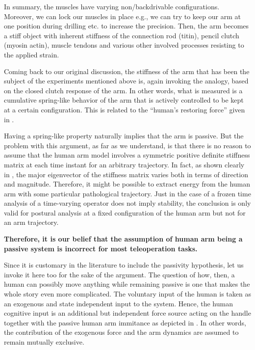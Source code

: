 In summary, the muscles have varying non/backdrivable configurations. Moreover, we can lock our muscles in place
e.g., we can try to keep our arm at one position during drilling etc. to increase the precision. Then, the arm becomes
a stiff object with inherent stiffness of the connection rod (titin), pencil clutch (myosin actin), muscle tendons and
 various other involved processes resisting to the applied strain. 

Coming back to our original discussion, the stiffness of the arm that has been the subject of the experiments mentioned 
above is, again invoking the analogy, based on the closed clutch response of the arm. In other words, what is measured 
is a cumulative spring-like behavior of the arm that is actively controlled to be kept at a certain configuration. This 
is related to the \enquote{human's restoring force} given in . 

Having a spring-like property naturally implies that the arm is passive. But the problem with this argument, as far as 
we understand, is that there is no reason to assume that the human arm model involves a symmetric positive definite 
stiffness matrix at each time instant for an arbitrary trajectory. In fact, as shown clearly in \cite{mussa85}, the major eigenvector 
of the stiffness matrix varies both in terms of direction and magnitude. Therefore, it might be possible to extract energy 
from the human arm with some particular pathological trajectory. Just in the case of a frozen time analysis of a time-varying 
operator does not imply stability, the conclusion is only valid for postural analysis at a fixed configuration of the human arm 
but not for an arm trajectory. 

\textbf{Therefore, it is our belief that the assumption of human arm being a passive system is incorrect for most teleoperation tasks.}
 


Since it is customary in the literature to include the passivity hypothesis, let us invoke it here too for the sake of the argument. 
The question of how, then, a human can possibly move anything while remaining passive is one that makes the whole story even more 
complicated. The voluntary input of the human is taken as an exogenous and state independent input to the system. Hence, the human 
cognitive input is an additional but independent force source acting on the handle together with the passive human arm immitance 
as depicted in . In other words, the contribution of the exogenous force and the arm dynamics are assumed 
to remain mutually exclusive. 

